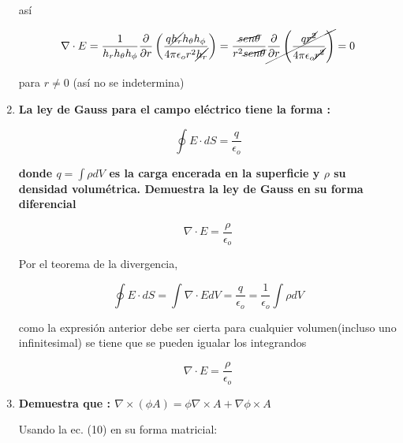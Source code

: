 \documentclass[12pt,a4paper]{article}
\begin{document}
\begin{enumerate}
    así
    
    \begin{equation*}
        \nabla \cdot E = \frac{1}{h_r h_\theta h_\phi} \frac{\partial}{\partial r} \left( \frac{q \cancel{ h_r} h_\theta h_\phi}{4 \pi \epsilon_o r^2 \cancel{h_r}} \right) = \frac{\cancel{sen \theta}}{r^2 \cancel{sen \theta}} \cancel{\frac{\partial}{\partial r} \left(\frac{q \cancel{r^2}}{4\pi \epsilon _o \cancel{r^2}} \right)} =0
    \end{equation*}
    
    para $r\neq0$ (así no se indetermina)
    
    
    
    \item \textbf{La ley de Gauss para el campo eléctrico tiene la forma :}
    
    \begin{equation*}
        \oint E \cdot dS = \frac{q}{\epsilon_o}
    \end{equation*}
    
    \textbf{donde $q = \int \rho dV$ es la carga encerada en la superficie y $\rho$ su densidad volumétrica. Demuestra la ley de Gauss en su forma diferencial}
    
    \begin{equation*}
        \nabla \cdot E = \frac{\rho}{\epsilon_o}
    \end{equation*}
    
    Por el teorema de la divergencia,
    
    \begin{equation*}
        \oint E \cdot dS = \int \nabla \cdot E dV = \frac{q}{\epsilon_o} = \frac{1}{\epsilon_o} \int \rho dV
    \end{equation*}
    
    como la expresión anterior debe ser cierta para cualquier volumen(incluso uno infinitesimal) se tiene que se pueden igualar los integrandos
    
    \begin{equation*}
        \nabla \cdot E = \frac{\rho}{\epsilon_o}
    \end{equation*}
    
    
    
    
    
    \item \textbf{Demuestra que : $\nabla \times (\phi A) = \phi \nabla \times A + \nabla \phi  \times A$}
    
    Usando la ec. (10) en su forma matricial:
    

\end{enumerate}
\end{document}
